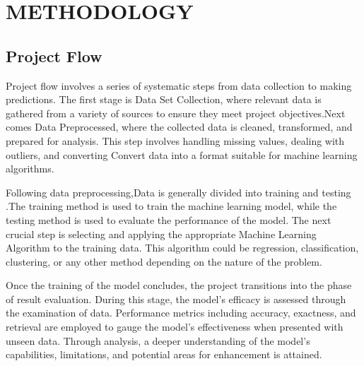 \chapter{METHODOLOGY}
\label{chap:Proposed Methodology 1}
\section{Project Flow}
Project flow involves a series of systematic steps from data collection to making predictions. The first stage is Data Set Collection, where relevant data is gathered from a variety of sources to ensure they meet project objectives.Next comes Data Preprocessed, where the collected data is cleaned, transformed, and prepared for analysis. This step involves handling missing values, dealing with outliers, and converting Convert data into a format suitable for machine learning algorithms.

Following data preprocessing\cite{mishra2020new},Data is generally divided into training and testing .The training method is used to train the machine learning model, while the testing method is used to evaluate the performance of the model. The next crucial step is selecting and applying the appropriate Machine Learning Algorithm to the training data. This algorithm could be regression, classification, clustering, or any other method depending on the nature of the problem.

Once the training of the model concludes, the project transitions into the phase of result evaluation. During this stage, the model's efficacy is assessed through the examination of data. Performance metrics including accuracy, exactness, and retrieval are employed to gauge the model's effectiveness when presented with unseen data. Through analysis, a deeper understanding of the model's capabilities, limitations, and potential areas for enhancement is attained.

